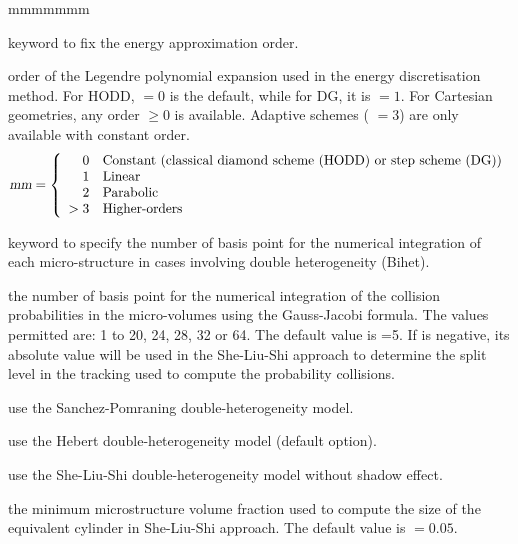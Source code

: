 \begin{ListeDeDescription}{mmmmmmm}
\item[\moc{EDIAM}] keyword to fix the energy approximation order.

\item[\dusa{emm}] order of the Legendre polynomial expansion used in the energy discretisation method. For HODD,  $=0$ is the default, while for DG, it is  $=1$.
For Cartesian geometries, any order  $\geq0$ is available. Adaptive schemes ( $=3$) are only available with constant order.
\begin{displaymath}
\dusa{mm} = \left\{
\begin{array}{rl}
 0 & \textrm{Constant (classical diamond scheme (HODD) or step scheme (DG))} \\
 1 & \textrm{Linear} \\
 2 & \textrm{Parabolic} \\
 >3  & \textrm{Higher-orders}
\end{array} \right.
\end{displaymath}

\item[\moc{QUAB}] keyword to specify the number of basis point for the
numerical integration of each micro-structure in cases involving double
heterogeneity (Bihet).

\item[\dusa{iquab}] the number of basis point for the numerical integration of
the collision probabilities in the micro-volumes using the  Gauss-Jacobi
formula. The values permitted are: 1 to 20, 24, 28, 32 or  64. The default value
is =5. If  is negative, its absolute value will be used in the She-Liu-Shi approach to determine the
split level in the tracking used to compute the probability collisions.

\item[\moc{SAPO}] use the Sanchez-Pomraning double-heterogeneity model.\cite{sapo}

\item[\moc{HEBE}] use the Hebert double-heterogeneity model (default option).\cite{BIHET}

\item[\moc{SLSI}] use the She-Liu-Shi double-heterogeneity model without shadow effect.\cite{She2017}

\item[\dusa{frtm}] the minimum microstructure volume fraction used to compute the size of the equivalent cylinder in She-Liu-Shi approach. The default value is  $=0.05$.

\end{ListeDeDescription}

\eject
